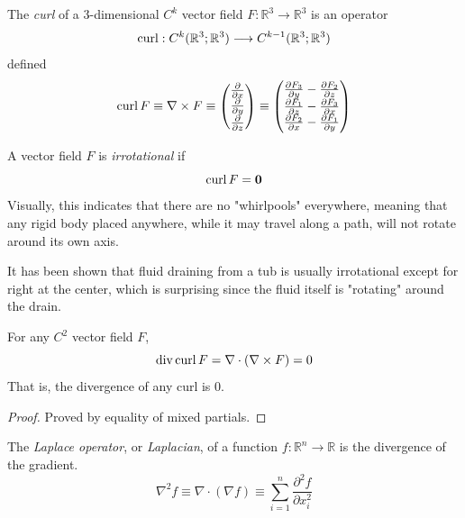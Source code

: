   \begin{definition}[Curl]
  The \textit{curl} of a 3-dimensional $C^k$ vector field $F: \mathbb{R}^3 \longrightarrow \mathbb{R}^3$ is an operator
  \[\curl: C^k (\mathbb{R}^3; \mathbb{R}^3) \longrightarrow C^{k-1} (\mathbb{R}^3; \mathbb{R}^3)\]
  defined
  \[\curl{F} \equiv \nabla \times F \equiv \begin{pmatrix}
  \frac{\partial}{\partial x} \\ \frac{\partial}{\partial y}\\ \frac{\partial}{\partial z} \end{pmatrix} \equiv \begin{pmatrix}
  \frac{\partial F_3}{\partial y} - \frac{\partial F_2}{\partial z} \\
  \frac{\partial F_1}{\partial z} - \frac{\partial F_3}{\partial x} \\
  \frac{\partial F_2}{\partial x} - \frac{\partial F_1}{\partial y}
  \end{pmatrix}\]
  \end{definition}

  \begin{definition}
  A vector field $F$ is \textit{irrotational} if 
  \[\curl{F} = \mathbf{0}\]
  Visually, this indicates that there are no "whirlpools" everywhere, meaning that any rigid body placed anywhere, while it may travel along a path, will not rotate around its own axis. 
  \end{definition}

  It has been shown that fluid draining from a tub is usually irrotational except for right at the center, which is surprising since the fluid itself is "rotating" around the drain. 

  \begin{theorem}
  For any $C^2$ vector field $F$, 
  \[\Div{\curl{F}} = \nabla\cdot (\nabla \times F) = 0\]
  That is, the divergence of any curl is 0. 
  \end{theorem}
  \begin{proof}
  Proved by equality of mixed partials. 
  \end{proof}

  \begin{definition}
  The \textit{Laplace operator}, or \textit{Laplacian}, of a function $f: \mathbb{R}^n \longrightarrow \mathbb{R}$ is the divergence of the gradient. 
  \[\nabla^2 f \equiv \nabla \cdot (\nabla f) \equiv \sum_{i=1}^n \frac{\partial^2 f}{\partial x_i^2}\]
  \end{definition}

